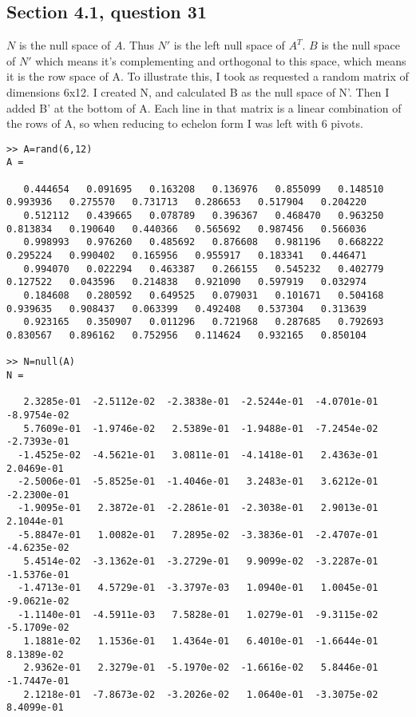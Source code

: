 \documentclass[a4paper,11pt]{article}
\begin{document}
\subsection*{Section 4.1, question 31}
$N$ is the null space of $A$. Thus $N'$ is the left null space of $A^T$. $B$ is the null space of $N'$ which means it's complementing and orthogonal to this space, which means it is the row space of A.  
To illustrate this, I took as requested a random matrix of dimensions 6x12. I created N, and calculated B as the null space of N'. Then I added B' at the bottom of A. Each line in that matrix is a linear combination of the rows of A, so when reducing to echelon form I was left with 6 pivots.
\begin{Verbatim}[fontsize=\tiny]
>> A=rand(6,12)
A =

   0.444654   0.091695   0.163208   0.136976   0.855099   0.148510   0.993936   0.275570   0.731713   0.286653   0.517904   0.204220
   0.512112   0.439665   0.078789   0.396367   0.468470   0.963250   0.813834   0.190640   0.440366   0.565692   0.987456   0.566036
   0.998993   0.976260   0.485692   0.876608   0.981196   0.668222   0.295224   0.990402   0.165956   0.955917   0.183341   0.446471
   0.994070   0.022294   0.463387   0.266155   0.545232   0.402779   0.127522   0.043596   0.214838   0.921090   0.597919   0.032974
   0.184608   0.280592   0.649525   0.079031   0.101671   0.504168   0.939635   0.908437   0.063399   0.492408   0.537304   0.313639
   0.923165   0.350907   0.011296   0.721968   0.287685   0.792693   0.830567   0.896162   0.752956   0.114624   0.932165   0.850104

>> N=null(A)
N =

   2.3285e-01  -2.5112e-02  -2.3838e-01  -2.5244e-01  -4.0701e-01  -8.9754e-02
   5.7609e-01  -1.9746e-02   2.5389e-01  -1.9488e-01  -7.2454e-02  -2.7393e-01
  -1.4525e-02  -4.5621e-01   3.0811e-01  -4.1418e-01   2.4363e-01   2.0469e-01
  -2.5006e-01  -5.8525e-01  -1.4046e-01   3.2483e-01   3.6212e-01  -2.2300e-01
  -1.9095e-01   2.3872e-01  -2.2861e-01  -2.3038e-01   2.9013e-01   2.1044e-01
  -5.8847e-01   1.0082e-01   7.2895e-02  -3.3836e-01  -2.4707e-01  -4.6235e-02
   5.4514e-02  -3.1362e-01  -3.2729e-01   9.9099e-02  -3.2287e-01  -1.5376e-01
  -1.4713e-01   4.5729e-01  -3.3797e-03   1.0940e-01   1.0045e-01  -9.0621e-02
  -1.1140e-01  -4.5911e-03   7.5828e-01   1.0279e-01  -9.3115e-02  -5.1709e-02
   1.1881e-02   1.1536e-01   1.4364e-01   6.4010e-01  -1.6644e-01   8.1389e-02
   2.9362e-01   2.3279e-01  -5.1970e-02  -1.6616e-02   5.8446e-01  -1.7447e-01
   2.1218e-01  -7.8673e-02  -3.2026e-02   1.0640e-01  -3.3075e-02   8.4099e-01


\end{Verbatim}
\end{document}
